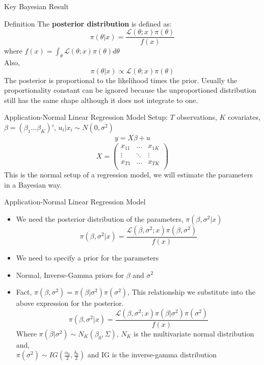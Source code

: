 \documentclass[table]{beamer}
\begin{document}
\begin{frame}{Key Bayesian Result}
	\begin{block}{Definition}
		The \textbf{posterior distribution} is defined as:
		\[ \pi(\theta|x) = \frac{\mathscr{L}(\theta;x)\pi(\theta) }{ f(x) } \]
		where $ f(x) = \int_{\theta} \mathscr{L}(\theta;x)\pi(\theta) d\theta $ \\
		Also, 
		\[ \pi(\theta|x) \propto \mathscr{L}(\theta;x)\pi(\theta)  \]
		The posterior is proportional to the likelihood times the prior. Usually the proportionality constant can be ignored because the unproportioned distribution still has the same shape although it does not integrate to one. 
	\end{block}
\end{frame}


\begin{frame}{Application-Normal Linear Regression Model}
	Setup: $ T $ observations, $ K  $ covariates, $\beta = (\beta_1 \dots \beta_K)' $, $ u_i|x_i \sim N(0,\sigma^2) $
	\begin{align}
		y = X\beta + u
	\end{align}
	\[  X = \begin{pmatrix}
				x_{11} & \dots  & x_{1K} \\
				\vdots	   & \ddots &\vdots	\\		
				x_{T1} & \dots  & x_{TK} \\				
			\end{pmatrix} \]
			This is the normal setup of a regression  model, we will estimate the parameters in a Bayesian way.
\end{frame}

\begin{frame}{Application-Normal Linear Regression Model}
	\begin{itemize}
		\item We need the posterior distribution of the parameters, $ \pi(\beta, \sigma^2 | x) $
		\[  \pi(\beta, \sigma^2 | x) = \frac{  \mathscr{L}(\beta, \sigma^2;x)\pi(\beta, \sigma^2) }{ f(x) } \]
		\item We need to specify a prior for the parameters
		\item Normal, Inverse-Gamma priors for $ \beta $ and $ \sigma^2 $
		\item Fact, $ \pi(\beta, \sigma^2) = \pi(\beta|\sigma^2)\pi(\sigma^2) $, This relationship we substitute into the above expression for the posterior. 
		\[  \pi(\beta, \sigma^2 | x) = \frac{  \mathscr{L}(\beta, \sigma^2;x) \pi(\beta|\sigma^2)\pi(\sigma^2) }{ f(x) } \]
		Where $ \pi(\beta|\sigma^2) \sim N_K(\beta_0, \Sigma) $, $ N_K $ is the multivariate normal distribution and,\\
		$ \pi(\sigma^2) \sim IG(\frac{ \alpha_0 }{2}, \frac{ \delta_0 }{2}  ) $ and IG is the inverse-gamma distribution
	\end{itemize}
\end{frame}
\end{document}
